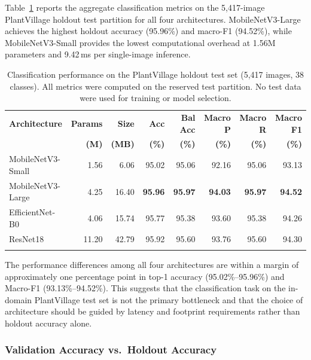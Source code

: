 \documentclass[pdflatex,sn-mathphys-num]{sn-jnl}
\theoremstyle{thmstyleone}%
\theoremstyle{thmstyletwo}%
\theoremstyle{thmstylethree}%
\begin{document}
Table~\ref{tab:pv_results} reports the aggregate classification metrics on the
5{,}417-image PlantVillage holdout test partition for all four architectures.
MobileNetV3-Large achieves the highest holdout accuracy (95.96\%) and macro-F1
(94.52\%), while MobileNetV3-Small provides the lowest computational overhead at
1.56M parameters and 9.42\,ms per single-image inference.

\begin{table}[h]
\caption{Classification performance on the PlantVillage holdout test set (5{,}417
images, 38 classes). All metrics were computed on the reserved test partition.
No test data were used for training or model selection.}\label{tab:pv_results}%
\setlength{\tabcolsep}{2.5pt}%
\begin{tabular*}{\textwidth}{@{\extracolsep\fill}lrrrrrrr}
\toprule
\textbf{Architecture} & \textbf{Params} & \textbf{Size} & \textbf{Acc} & \textbf{Bal Acc} & \textbf{Macro P} & \textbf{Macro R} & \textbf{Macro F1} \\
& \textbf{(M)} & \textbf{(MB)} & \textbf{(\%)} & \textbf{(\%)} & \textbf{(\%)} & \textbf{(\%)} & \textbf{(\%)} \\
\midrule
MobileNetV3-Small  & 1.56 &  6.06 & 95.02 & 95.06 & 92.16 & 95.06 & 93.13 \\
MobileNetV3-Large  & 4.25 & 16.40 & \textbf{95.96} & \textbf{95.97} & \textbf{94.03} & \textbf{95.97} & \textbf{94.52} \\
EfficientNet-B0    & 4.06 & 15.74 & 95.77 & 95.38 & 93.60 & 95.38 & 94.26 \\
ResNet18           & 11.20 & 42.79 & 95.92 & 95.60 & 93.76 & 95.60 & 94.30 \\
\botrule
\end{tabular*}
\end{table}

The performance differences among all four architectures are within a margin of
approximately one percentage point in top-1 accuracy (95.02\%--95.96\%) and Macro-F1
(93.13\%--94.52\%). This suggests that the classification task on the in-domain
PlantVillage test set is not the primary bottleneck and that the choice of architecture
should be guided by latency and footprint requirements rather than holdout accuracy alone.

\subsubsection{Validation Accuracy vs.\ Holdout Accuracy}
\end{document}
